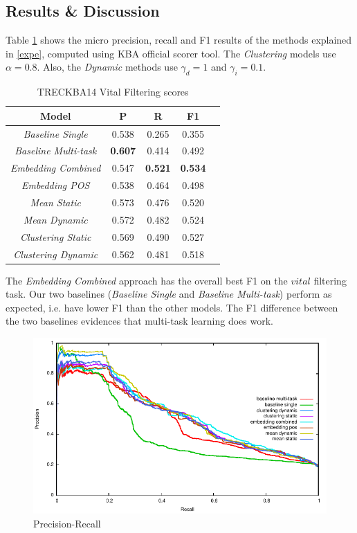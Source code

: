 \documentclass{article}
\begin{document}
\subsection{Results \& Discussion}

Table \ref{res} shows the micro precision, recall and F1 results of the methods explained in \ref{expe}, computed using KBA official scorer tool. The \textit{Clustering} models use $\alpha=0.8$. Also, the \textit{Dynamic} methods use $\gamma_d=1$ and $\gamma_i=0.1$.

\begin{table}[H]
\center
\begin{tabular}{|c|c|c|c|c|} \hline
\textbf{Model} & \textbf{P} & \textbf{R} & \textbf{F1} \\ \hline\hline
{\textit{Baseline Single}} & 0.538 & 0.265 & 0.355 \\ \hline
{\textit{Baseline Multi-task}} & \textbf{0.607} & 0.414 & 0.492 \\ \hline
{\textit{Embedding Combined}} & 0.547 & \textbf{0.521} & \textbf{0.534} \\ \hline
{\textit{Embedding POS}} & 0.538 & 0.464 & 0.498 \\ \hline
{\textit{Mean Static}} & 0.573 & 0.476 & 0.520 \\ \hline
{\textit{Mean Dynamic}} & 0.572 & 0.482 & 0.524 \\ \hline
{\textit{Clustering Static}} & 0.569 & 0.490 & 0.527 \\ \hline
{\textit{Clustering Dynamic}} & 0.562 & 0.481 & 0.518 \\ \hline
\end{tabular}
\caption{TRECKBA14 Vital Filtering scores}
\label{res}
\end{table}

The {\textit{Embedding Combined}} approach has the overall best F1 on the $vital$ filtering task. Our two baselines ({\textit{Baseline Single}} and {\textit{Baseline Multi-task}}) perform as expected, i.e. have lower F1 than the other models. The F1 difference between the two baselines evidences that multi-task learning does work.

\begin{figure}[h!]
\centering
\includegraphics[width=.5\textwidth]{overlapped.pdf}
\caption{Precision-Recall}
\label{precrecall}
\end{figure}
\end{document}
